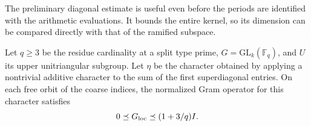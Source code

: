 The preliminary diagonal estimate is useful even before the periods are identified with the arithmetic evaluations. It bounds the entire kernel, so its dimension can be compared directly with that of the ramified subspace.

\begin{auxlemma}\label{lem:coarse-split-gram}
Let \(q\ge3\) be the residue cardinality at a split type prime, \(G=\mathrm{GL}_k(\mathbb F_q)\), and \(U\) its upper unitriangular subgroup. Let \(\eta\) be the character obtained by applying a nontrivial additive character to the sum of the first superdiagonal entries. On each free orbit of the coarse indices, the normalized Gram operator for this character satisfies
\[
                         0\preceq G_{\rm loc}\preceq(1+3/q)I .
\]
\end{auxlemma}
